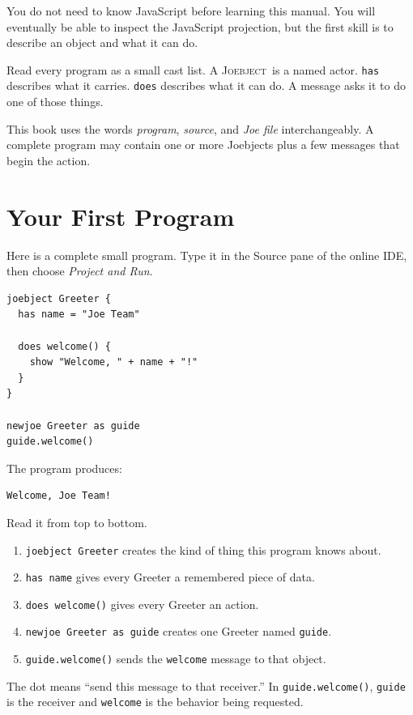 \documentclass[12pt]{article}
\newcommand{\Joebject}{\textsc{Joebject}}
\newcommand{\kw}[1]{\texttt{#1}}
\begin{document}
You do not need to know JavaScript before learning this manual. You will eventually be able to inspect the JavaScript projection, but the first skill is to describe an object and what it can do.

\begin{tipbox}
Read every program as a small cast list. A \Joebject\ is a named actor. \kw{has} describes what it carries. \kw{does} describes what it can do. A message asks it to do one of those things.
\end{tipbox}

This book uses the words \emph{program}, \emph{source}, and \emph{Joe file} interchangeably. A complete program may contain one or more Joebjects plus a few messages that begin the action.

\clearpage
\section{Your First Program}
Here is a complete small program. Type it in the Source pane of the online IDE, then choose \emph{Project and Run}.

\begin{lstlisting}[style=joe]
joebject Greeter {
  has name = "Joe Team"

  does welcome() {
    show "Welcome, " + name + "!"
  }
}

newjoe Greeter as guide
guide.welcome()
\end{lstlisting}

The program produces:

\begin{lstlisting}[style=joe]
Welcome, Joe Team!
\end{lstlisting}

Read it from top to bottom.
\begin{enumerate}
  \item \kw{joebject Greeter} creates the kind of thing this program knows about.
  \item \kw{has name} gives every Greeter a remembered piece of data.
  \item \kw{does welcome()} gives every Greeter an action.
  \item \kw{newjoe Greeter as guide} creates one Greeter named \kw{guide}.
  \item \kw{guide.welcome()} sends the \kw{welcome} message to that object.
\end{enumerate}

\begin{rulebox}
The dot means ``send this message to that receiver.'' In \kw{guide.welcome()}, \kw{guide} is the receiver and \kw{welcome} is the behavior being requested.
\end{rulebox}
\end{document}
